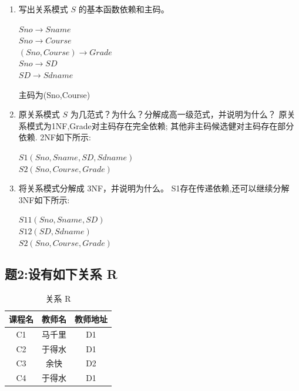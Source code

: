\documentclass[a4paper,12pt,UTF8,fontset=none]{ctexart}
\begin{document}
\begin{enumerate}
  \item 写出关系模式 $S$ 的基本函数依赖和主码。
  \begin{center}
  $Sno \rightarrow Sname $\\
  $Sno \rightarrow Course$\\
  $(Sno,Course) \rightarrow Grade$\\
  $Sno \rightarrow SD$\\
  $SD \rightarrow Sdname$
  \par 主码为(Sno,Course)
  \end{center}
  \item 原关系模式 $S$ 为几范式？为什么？分解成高一级范式，并说明为什么？
  原关系模式为1NF,Grade对主码存在完全依赖;
  其他非主码候选健对主码存在部分依赖.
  2NF如下所示:\par
  \begin{center}
    
  $S1(Sno,Sname,SD,Sdname)$\\
  $S2(Sno,Course,Grade)$\\
  \end{center}
  \item 将关系模式分解成 3NF，并说明为什么。
  S1存在传递依赖,还可以继续分解
  3NF如下所示:\par
  \begin{center}
    
  $S11(Sno,Sname,SD)$\\
  $S12(SD,Sdname)$\\
  $S2(Sno,Course,Grade)$
  \end{center}
\end{enumerate}
\subsection*{题2:设有如下关系 R}
\FloatBarrier
\begin{table}[htbp]
    \centering
    \caption{关系 R}
    \vskip 2mm
    \begin{tabular}{ccc}
        \toprule %
        \textbf{课程名} & \textbf{教师名} & \textbf{教师地址} \\ 
        \midrule %
        C1 & 马千里 & D1 \\ 
        C2 & 于得水 & D1 \\ 
        C3 & 余快 & D2 \\ 
        C4 & 于得水 & D1 \\ 
        \bottomrule %
    \end{tabular}
\end{table}
\end{document}

